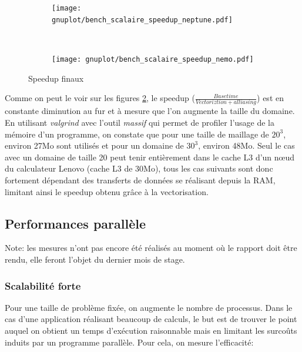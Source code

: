 \begin{figure}[!ht]
  \centering
  \begin{subfigure}[b]{0.5\textwidth}
    \centering
    \texttt{[image: gnuplot/bench\_scalaire\_speedup\_neptune.pdf]}
  \caption{\label{fig:bench_scal_neptune_speedup}}
  \end{subfigure}%
  ~
  \begin{subfigure}[b]{0.5\textwidth}
    \centering
    \texttt{[image: gnuplot/bench\_scalaire\_speedup\_nemo.pdf]}
  \caption{\label{fig:bench_scal_nemo_speedup}}
  \end{subfigure}
  \caption{\label{fig:bench_scal_speedups}Speedup finaux}
\end{figure}

Comme on peut le voir sur les figures \ref{fig:bench_scal_nemo_speedup}, le speedup ($\frac{Base time}{Vectoriztion+alliasing}$) est en constante diminution au fur et à mesure que l'on augmente la taille du domaine. En utilisant \textit{valgrind} avec l'outil \textit{massif} qui permet de profiler l'usage de la mémoire d'un programme, on constate que pour une taille de maillage de $20^3$, environ 27Mo sont utilisés et pour un domaine de $30^3$, environ 48Mo. Seul le cas avec un domaine de taille 20 peut tenir entièrement dans le cache L3 d'un nœud du calculateur Lenovo (cache L3 de 30Mo), tous les cas suivants sont donc fortement dépendant des transferts de données se réalisant depuis la RAM, limitant ainsi le speedup obtenu grâce à la vectorisation.

\subsection{Performances parallèle}\label{sec:scal}

Note: les mesures n'ont pas encore été réalisés au moment où le rapport doit être rendu, elle feront l'objet du dernier mois de stage.


\subsubsection{Scalabilité forte}\label{sec:scal-strong}
Pour une taille de problème fixée, on augmente le nombre de processus. Dans le cas d'une application réalisant beaucoup de calculs, le but est de trouver le point auquel on obtient un temps d'exécution raisonnable mais en limitant les surcoûts induits par un programme parallèle. Pour cela, on mesure l'efficacité:

